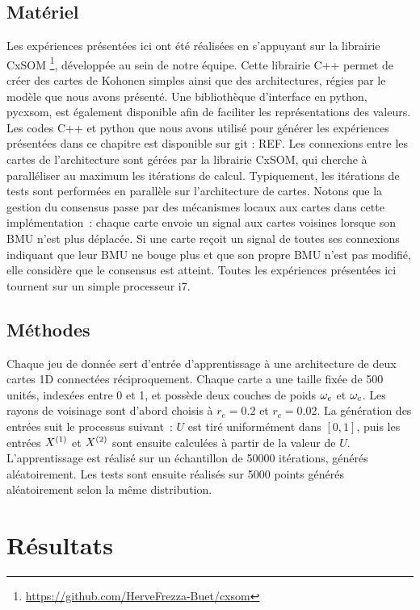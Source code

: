 \documentclass[../main]{subfiles}
\begin{document}
\subsection{Matériel}

Les expériences présentées ici ont été réalisées en s'appuyant sur la librairie CxSOM \footnote{\url{https://github.com/HerveFrezza-Buet/cxsom}}, développée au sein de notre équipe.
Cette librairie C++ permet de créer des cartes de Kohonen simples ainsi que des architectures, régies par le modèle que nous avons présenté.
Une bibliothèque d'interface en python, pycxsom, est également disponible afin de faciliter les représentations des valeurs.
Les codes C++ et python que nous avons utilisé pour générer les expériences présentées dans ce chapitre est disponible sur git : REF.
Les connexions entre les cartes de l'architecture sont gérées par la librairie CxSOM, qui cherche à paralléliser au maximum les itérations de calcul. 
Typiquement, les itérations de tests sont performées en parallèle sur l'architecture de cartes.
Notons que la gestion du consensus passe par des mécanismes locaux aux cartes dans cette implémentation~: chaque carte envoie un signal aux cartes voisines lorsque son BMU n'est plus déplacée. Si une carte reçoit un signal de toutes ses connexions indiquant que leur BMU ne bouge plus et que son propre BMU n'est pas modifié, elle considère que le consensus est atteint.
Toutes les expériences présentées ici tournent sur un simple processeur i7.

\subsection{Méthodes}

Chaque jeu de donnée sert d'entrée d'apprentissage à une architecture de deux cartes 1D connectées réciproquement. Chaque carte a une taille fixée de 500 unités, indexées entre 0 et 1, et possède deux couches de poids $\omega_e$ et $\omega_c$. Les rayons de voisinage sont d'abord choisis à $r_e = 0.2$ et $r_c = 0.02$.
La génération des entrées suit le processus suivant~: $U$ est tiré uniformément dans $[0,1]$, puis les entrées $X^{({1})}$ et $X^{({2})}$ sont ensuite calculées à partir de la valeur de $U$.
L'apprentissage est réalisé sur un échantillon de 50000 itérations, générés aléatoirement. Les tests sont ensuite réalisés sur 5000 points générés aléatoirement selon la même distribution.



\section{Résultats}
\end{document}
